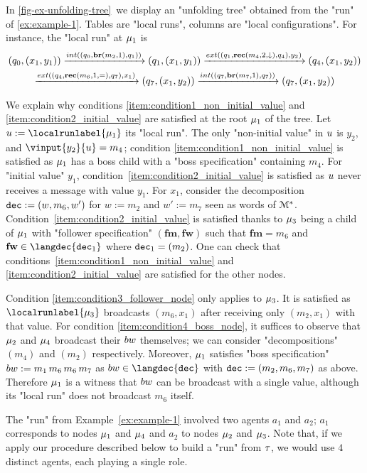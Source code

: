 \begin{example}
	In \cref{fig-ex-unfolding-tree}~we display an "unfolding tree" obtained from the "run" of \cref{ex:example-1}. Tables are "local runs", columns are "local configurations". For instance, the "local run" at $\mu_1$ is \begin{multline*} 
	(q_0, (x_1,y_1)) \intstep{(q_0, \br{m_2}{1},q_1)} (q_1, (x_1, y_1)) \extbr{(q_1, \rec{m_4}{2}{\enregact}, q_4)}{y_2} (q_4, (x_1, y_2)) \\ \extbr{(q_4, \rec{m_6}{1}{\eqtestact}, q_7)}{x_1} (q_7, (x_1, y_2)) \intstep{(q_7, \br{m_7}{1},q_7)} (q_7, (x_1, y_2)) \end{multline*}
	

	
	We explain why conditions \ref{item:condition1_non_initial_value} and \ref{item:condition2_initial_value} are satisfied at the root $\mu_1$ of the tree. Let $\localrun := \localrunlabel{\node_1}$ its "local run". 
	The only "non-initial value" in $u$ is $y_2$, and $\vinput{y_2}{\localrun} = m_4$; condition \ref{item:condition1_non_initial_value} is satisfied as $\mu_1$ has a boss child with a "boss specification" containing $m_4$. 
	For "initial value" $y_1$, condition~\ref{item:condition2_initial_value} is satisfied as $u$ never receives a message with value $y_1$. For $x_1$, consider the decomposition $\mathtt{dec} := (w, m_6, w')$ for $w:= m_2$ and $w' := m_7$ seen as words of $\mathcal{M}^*$. Condition~\ref{item:condition2_initial_value} is satisfied thanks to $\mu_3$ being a child of $\mu_1$ with "follower specification" $(\mathbf{fm}, \mathbf{fw})$ such that $\mathbf{fm} = m_6$ and $\mathbf{fw} \in \langdec{\decsymb_1}$ where $\mathtt{dec}_1 = (m_2)$. One can check that conditions~\ref{item:condition1_non_initial_value} and \ref{item:condition2_initial_value} are satisfied for the other nodes. 
	
	Condition \ref{item:condition3_follower_node} only applies to $\mu_3$. It is satisfied as $\localrunlabel{\node_3}$ broadcasts $(m_6,x_1)$ after receiving only $(m_2,x_1)$ with that value. 
	For condition \ref{item:condition4_boss_node}, it suffices to observe that $\mu_2$ and $\mu_4$ broadcast their $\bossspec$ themselves; we can consider "decompositions" $(m_4)$ and $(m_2)$ respectively. Moreover, $\mu_1$ satisfies "boss specification" $\bossspec:= m_1 \, m_6 \, m_6 \, m_7$ as $\bossspec \in \langdec{\decsymb}$ with $\mathtt{dec} := (m_2, m_6, m_7)$ as above. Therefore $\mu_1$ is a witness that $\bossspec$ can be broadcast with a single value, although its "local run" does not broadcast $m_6$ itself. 
	
	The "run" from Example~\ref{ex:example-1} involved two agents $a_1$ and $a_2$; $a_1$ corresponds to nodes $\mu_1$ and $\mu_4$ and $a_2$ 
	to nodes $\mu_2$ and $\mu_3$. Note that, if we apply our procedure described below to build a "run" from $\tau$, we would use $4$ distinct agents, each playing a single role.
\end{example}


